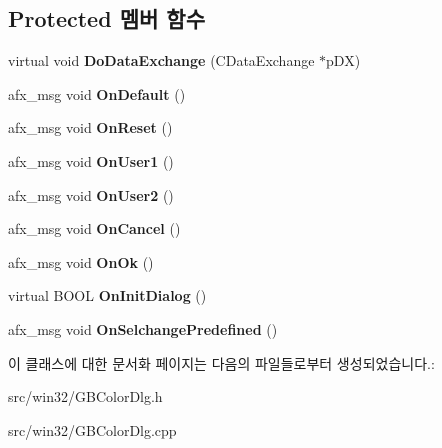 \subsection*{Protected 멤버 함수}
\begin{DoxyCompactItemize}
\item 
\mbox{\label{class_g_b_color_dlg_ab1cf7d47e5c9154f6ca742678242f861}} 
virtual void {\bfseries Do\+Data\+Exchange} (C\+Data\+Exchange $\ast$p\+DX)
\item 
\mbox{\label{class_g_b_color_dlg_ae38cfe6c74e0cc3d920a05567fd02581}} 
afx\+\_\+msg void {\bfseries On\+Default} ()
\item 
\mbox{\label{class_g_b_color_dlg_adab1ec84eb5ffdf0489cfe025d01ea7b}} 
afx\+\_\+msg void {\bfseries On\+Reset} ()
\item 
\mbox{\label{class_g_b_color_dlg_a2648ec830505581e9268be52c4136df6}} 
afx\+\_\+msg void {\bfseries On\+User1} ()
\item 
\mbox{\label{class_g_b_color_dlg_a932281a7e5ed6c1e816dff7403d1ee2e}} 
afx\+\_\+msg void {\bfseries On\+User2} ()
\item 
\mbox{\label{class_g_b_color_dlg_ab17b13356eebe33676cd07b8b6c75d8c}} 
afx\+\_\+msg void {\bfseries On\+Cancel} ()
\item 
\mbox{\label{class_g_b_color_dlg_a8e5665fcb4b77352198f77936b53190d}} 
afx\+\_\+msg void {\bfseries On\+Ok} ()
\item 
\mbox{\label{class_g_b_color_dlg_a376d61164a4ef4b8a60a0a3297e5470e}} 
virtual B\+O\+OL {\bfseries On\+Init\+Dialog} ()
\item 
\mbox{\label{class_g_b_color_dlg_aa2227421c4564023d2ded8198b2194d3}} 
afx\+\_\+msg void {\bfseries On\+Selchange\+Predefined} ()
\end{DoxyCompactItemize}


이 클래스에 대한 문서화 페이지는 다음의 파일들로부터 생성되었습니다.\+:\begin{DoxyCompactItemize}
\item 
src/win32/G\+B\+Color\+Dlg.\+h\item 
src/win32/G\+B\+Color\+Dlg.\+cpp\end{DoxyCompactItemize}
